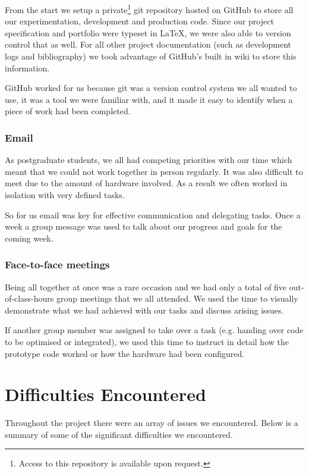 \documentclass[11pt,a4paper,titlepage]{report}
\begin{document}
From the start we setup a private\footnote{Access to this repository is available upon request.} git repository hosted on GitHub to store all our experimentation, development and production code. Since our project specification and portfolio were typeset in \LaTeX, we were also able to version control that as well. For all other project documentation (such as development logs and bibliography) we took advantage of GitHub's built in wiki to store this information.

GitHub worked for us because git was a version control system we all wanted to use, it was a tool we were familiar with, and it made it easy to identify when a piece of work had been completed.

\subsubsection{Email}

As postgraduate students, we all had competing priorities with our time which meant that we could not work together in person regularly. It was also difficult to meet due to the amount of hardware involved. As a result we often worked in isolation with very defined tasks.

So for us email was key for effective communication and delegating tasks. Once a week a group message was used to talk about our progress and goals for the coming week.

\subsubsection{Face-to-face meetings}

Being all together at once was a rare occasion and we had only a total of five out-of-class-hours group meetings that we all attended. We used the time to visually demonstrate what we had achieved with our tasks and discuss arising issues. 

If another group member was assigned to take over a task (e.g. handing over code to be optimised or integrated), we used this time to instruct in detail how the prototype code worked or how the hardware had been configured. 

\section{Difficulties Encountered}


Throughout the project there were an array of issues we encountered. Below is a summary of some of the significant difficulties we encountered.
\end{document}
